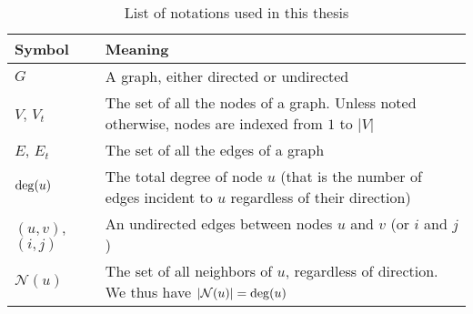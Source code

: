 \begin{table*}[htpb]
  \centering
  \caption{List of notations used in this thesis}\label{tab:notations}%
  \vspace{-.5\baselineskip}
  \begin{tabulary}{187mm}{LL}
    \toprule
    Symbol & Meaning \\
    \midrule
    $G$ & A graph, either directed or undirected \\
    $V$, $V_t$ & The set of all the nodes of a graph. Unless noted otherwise, nodes are indexed from $1$ to $|V|$ \\
    $E$, $E_t$ & The set of all the edges of a graph \\
    $\operatorname{deg}(u)$ & The total degree of node $u$ (that is the number of edges incident to $u$
    regardless of their direction) \\
    $(u,v)$, $(i,j)$ & An undirected edges between nodes $u$ and $v$ (or $i$ and $j$) \\
    $\mathcal{N}(u)$ & The set of all neighbors of $u$, regardless of direction. We thus have
    $|\mathcal{N}(u)| = \operatorname{deg}(u)$ \\
    \bottomrule
  \end{tabulary}
\end{table*}
